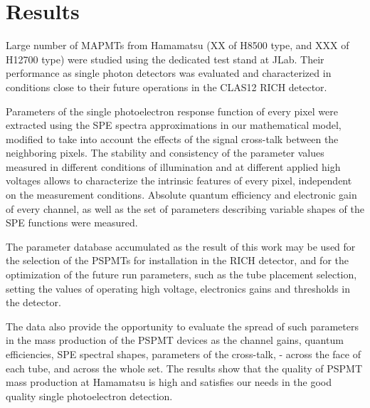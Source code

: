 \section{Results}


Large number of MAPMTs from Hamamatsu (XX of H8500 type, and XXX of H12700 type) were studied using the dedicated test stand at JLab. Their performance as single photon detectors was evaluated and characterized in conditions close to their future operations in the CLAS12 RICH detector.


Parameters of the single photoelectron response function of every pixel were extracted using the SPE spectra approximations in our mathematical model, modified to take into account the effects of the signal cross-talk between the neighboring pixels. The stability and consistency of the parameter values measured in different conditions of illumination and at different applied high voltages allows to characterize the intrinsic features of every pixel, independent on the measurement conditions. Absolute quantum efficiency and electronic gain of every channel, as well as the set of parameters describing variable shapes of the SPE functions were measured.


The parameter database accumulated as the result of this work may be used for the selection of the PSPMTs for installation in the RICH detector, and for the optimization of the future run parameters, such as the tube placement selection, setting the values of operating high voltage, electronics gains and thresholds in the detector.


The data also provide the opportunity to evaluate the spread of such parameters in the mass production of the PSPMT devices as the channel gains, quantum efficiencies, SPE spectral shapes, parameters of the cross-talk, - across the face of each tube, and across the whole set. The results show that the quality of PSPMT mass production at Hamamatsu is high and satisfies our needs in the good quality single photoelectron detection.




